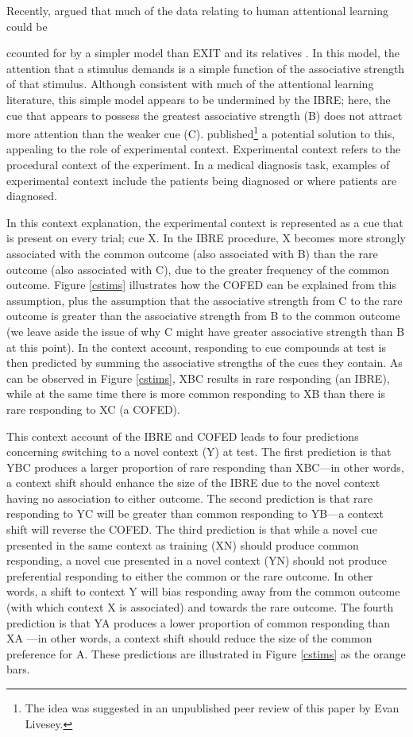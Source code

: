 \documentclass[twocolumn]{article}
\begin{document}
Recently, \cite{LePelley2016} argued that much of the data relating to human attentional learning could be {ccounted for by a simpler model than EXIT and its relatives \citep[e.g.][]{Mackintosh1975}. In this model, the attention that a stimulus demands is a simple function of the associative strength of that stimulus. Although consistent with much of the attentional learning literature, this simple model appears to be undermined by the IBRE; here, the cue that appears to possess the greatest associative strength (B) does not attract more attention than the weaker cue (C). \cite{LePelley2016} published\footnote{The idea was suggested in an unpublished peer review of this paper by Evan Livesey.} a potential solution to this, appealing to the role of experimental context.  Experimental context refers to the procedural context of the experiment. In a medical diagnosis task, examples of experimental context include the patients being diagnosed or where patients are diagnosed.

In this context explanation, the experimental context is represented as a cue that is present on every trial; cue X. In the IBRE procedure, X becomes more strongly associated with the common outcome (also associated with B) than the rare outcome (also associated with C), due to the greater frequency of the common outcome. Figure \ref{cstims} illustrates how the COFED can be explained from this assumption, plus the assumption that the associative strength from C to the rare outcome is greater than the associative strength from B to the common outcome (we leave aside the issue of why C might have greater associative strength than B at this point). In the context account, responding to cue compounds at test is then predicted by summing the associative strengths of the cues they contain. As can be observed in Figure \ref{cstims}, XBC results in rare responding (an IBRE), while at the same time there is more common responding to XB than there is rare responding to XC (a COFED). 

This context account of the IBRE and COFED leads to four predictions concerning  switching to a novel context (Y) at test. The first prediction is that YBC produces a larger proportion of rare responding than XBC---in other words, a context shift should enhance the size of the IBRE due to the novel context having no association to either outcome. The second prediction is that rare responding to YC will be greater than common responding to YB---a context shift will reverse the COFED. The third prediction is that while a novel cue presented in the same context as training (XN) should produce common responding, a novel cue presented in a novel context (YN) should not produce preferential responding to either the common or the rare outcome. In other words, a shift to context Y will bias responding away from the common outcome (with which context X is associated) and towards the rare outcome. The fourth prediction is that YA produces a lower proportion of common responding than XA ---in other words, a context shift should reduce the size of the common preference for A. These predictions are illustrated in Figure \ref{cstims} as the orange bars.

}
\end{document}
